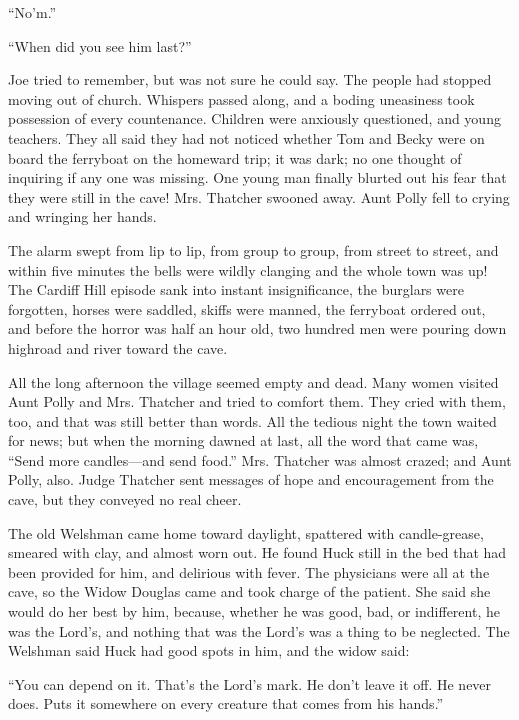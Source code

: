 \documentclass{book}
\begin{document}
“No’m.”

“When did you see him last?”

Joe tried to remember, but was not sure he could say. The people had stopped moving out of church. Whispers passed along, and a boding uneasiness took possession of every countenance. Children were anxiously questioned, and young teachers. They all said they had not noticed whether Tom and Becky were on board the ferryboat on the homeward trip; it was dark; no one thought of inquiring if any one was missing. One young man finally blurted out his fear that they were still in the cave! Mrs. Thatcher swooned away. Aunt Polly fell to crying and wringing her hands.

The alarm swept from lip to lip, from group to group, from street to street, and within five minutes the bells were wildly clanging and the whole town was up! The Cardiff Hill episode sank into instant insignificance, the burglars were forgotten, horses were saddled, skiffs were manned, the ferryboat ordered out, and before the horror was half an hour old, two hundred men were pouring down highroad and river toward the cave.

All the long afternoon the village seemed empty and dead. Many women visited Aunt Polly and Mrs. Thatcher and tried to comfort them. They cried with them, too, and that was still better than words. All the tedious night the town waited for news; but when the morning dawned at last, all the word that came was, “Send more candles—and send food.” Mrs. Thatcher was almost crazed; and Aunt Polly, also. Judge Thatcher sent messages of hope and encouragement from the cave, but they conveyed no real cheer.

The old Welshman came home toward daylight, spattered with candle-grease, smeared with clay, and almost worn out. He found Huck still in the bed that had been provided for him, and delirious with fever. The physicians were all at the cave, so the Widow Douglas came and took charge of the patient. She said she would do her best by him, because, whether he was good, bad, or indifferent, he was the Lord’s, and nothing that was the Lord’s was a thing to be neglected. The Welshman said Huck had good spots in him, and the widow said:

“You can depend on it. That’s the Lord’s mark. He don’t leave it off. He never does. Puts it somewhere on every creature that comes from his hands.”
\end{document}
